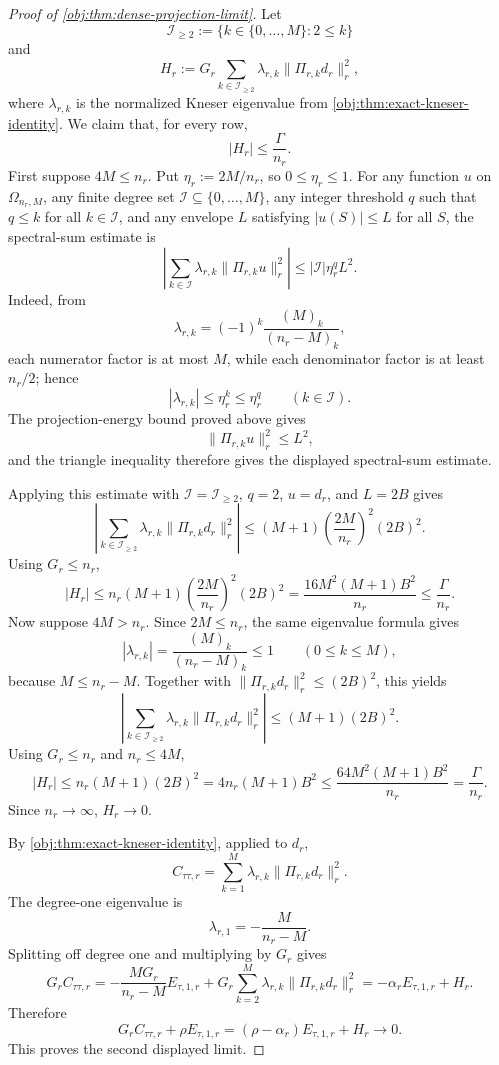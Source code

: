 \begin{proof}[Proof of \cref{obj:thm:dense-projection-limit}]
Let
\[
\mathcal I_{\ge2}:=\{k\in\{0,\ldots,M\}:2\le k\}
\]
and
\[
H_r:=
G_r\sum_{k\in\mathcal I_{\ge2}}\lambda_{r,k}\|\Pi_{r,k}d_r\|_r^2 ,
\]
where \(\lambda_{r,k}\) is the normalized Kneser eigenvalue from \cref{obj:thm:exact-kneser-identity}.  We claim that, for every row,
\[
|H_r|\le \frac{\Gamma}{n_r}.
\]
First suppose \(4M\le n_r\).  Put \(\eta_r:=2M/n_r\), so \(0\le\eta_r\le1\).  For any function \(u\) on \(\Omega_{n_r,M}\), any finite degree set \(\mathcal I\subseteq\{0,\ldots,M\}\), any integer threshold \(q\) such that \(q\le k\) for all \(k\in\mathcal I\), and any envelope \(L\) satisfying \(|u(S)|\le L\) for all \(S\), the spectral-sum estimate is
\[
\left|
\sum_{k\in\mathcal I}\lambda_{r,k}\|\Pi_{r,k}u\|_r^2
\right|
\le
|\mathcal I|\eta_r^qL^2 .
\]
Indeed, from
\[
\lambda_{r,k}=(-1)^k\frac{(M)_k}{(n_r-M)_k},
\]
each numerator factor is at most \(M\), while each denominator factor is at least \(n_r/2\); hence
\[
|\lambda_{r,k}|\le\eta_r^k\le\eta_r^q
\qquad (k\in\mathcal I).
\]
The projection-energy bound proved above gives
\[
\|\Pi_{r,k}u\|_r^2\le L^2,
\]
and the triangle inequality therefore gives the displayed spectral-sum estimate.

Applying this estimate with \(\mathcal I=\mathcal I_{\ge2}\), \(q=2\), \(u=d_r\), and \(L=2B\) gives
\[
\left|
\sum_{k\in\mathcal I_{\ge2}}\lambda_{r,k}\|\Pi_{r,k}d_r\|_r^2
\right|
\le
(M+1)\left(\frac{2M}{n_r}\right)^2(2B)^2 .
\]
Using \(G_r\le n_r\),
\[
|H_r|
\le
n_r(M+1)\left(\frac{2M}{n_r}\right)^2(2B)^2
=
\frac{16M^2(M+1)B^2}{n_r}
\le
\frac{\Gamma}{n_r}.
\]
Now suppose \(4M>n_r\).  Since \(2M\le n_r\), the same eigenvalue formula gives
\[
|\lambda_{r,k}|=\frac{(M)_k}{(n_r-M)_k}\le1
\qquad (0\le k\le M),
\]
because \(M\le n_r-M\).  Together with \(\|\Pi_{r,k}d_r\|_r^2\le(2B)^2\), this yields
\[
\left|
\sum_{k\in\mathcal I_{\ge2}}\lambda_{r,k}\|\Pi_{r,k}d_r\|_r^2
\right|
\le
(M+1)(2B)^2 .
\]
Using \(G_r\le n_r\) and \(n_r\le4M\),
\[
|H_r|
\le
n_r(M+1)(2B)^2
=4n_r(M+1)B^2
\le
\frac{64M^2(M+1)B^2}{n_r}
=
\frac{\Gamma}{n_r}.
\]
Since \(n_r\to\infty\), \(H_r\to0\).

By \cref{obj:thm:exact-kneser-identity}, applied to \(d_r\),
\[
C_{\tau\tau,r}
=
\sum_{k=1}^{M}\lambda_{r,k}\|\Pi_{r,k}d_r\|_r^2 .
\]
The degree-one eigenvalue is
\[
\lambda_{r,1}=-\frac{M}{n_r-M}.
\]
Splitting off degree one and multiplying by \(G_r\) gives
\[
G_rC_{\tau\tau,r}
=
-\frac{MG_r}{n_r-M}E_{\tau,1,r}
+
G_r\sum_{k=2}^{M}\lambda_{r,k}\|\Pi_{r,k}d_r\|_r^2
=
-\alpha_r E_{\tau,1,r}+H_r .
\]
Therefore
\[
G_rC_{\tau\tau,r}+\rho E_{\tau,1,r}
=
(\rho-\alpha_r)E_{\tau,1,r}+H_r
\to0 .
\]
This proves the second displayed limit.


\end{proof}

